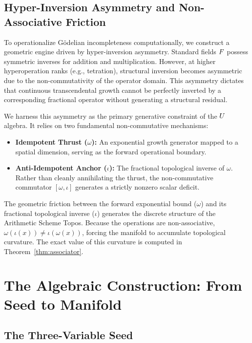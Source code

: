 \subsection{Hyper-Inversion Asymmetry and Non-Associative Friction}

To operationalize G\"odelian incompleteness computationally, we construct a geometric engine driven by hyper-inversion asymmetry. Standard fields $F$ possess symmetric inverses for addition and multiplication. However, at higher hyperoperation ranks (e.g., tetration), structural inversion becomes asymmetric due to the non-commutativity of the operator domain. This asymmetry dictates that continuous transcendental growth cannot be perfectly inverted by a corresponding fractional operator without generating a structural residual.

We harness this asymmetry as the primary generative constraint of the $U$ algebra. It relies on two fundamental non-commutative mechanisms:
\begin{itemize}
\item \textbf{Idempotent Thrust ($\omega$):} An exponential growth generator mapped to a spatial dimension, serving as the forward operational boundary.
\item \textbf{Anti-Idempotent Anchor ($\iota$):} The fractional topological inverse of $\omega$. Rather than cleanly annihilating the thrust, the non-commutative commutator $[\omega, \iota]$ generates a strictly nonzero scalar deficit.
\end{itemize}

The geometric friction between the forward exponential bound ($\omega$) and its fractional topological inverse ($\iota$) generates the discrete structure of the Arithmetic Scheme Topos. Because the operations are non-associative, $\omega(\iota(x)) \neq \iota(\omega(x))$, forcing the manifold to accumulate topological curvature. The exact value of this curvature is computed in Theorem~\ref{thm:associator}.

\section{The Algebraic Construction: From Seed to Manifold}

\subsection{The Three-Variable Seed}\label{sec:seed}


